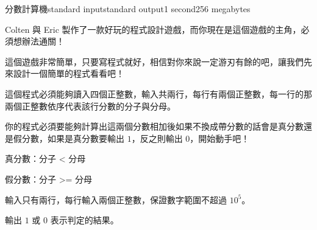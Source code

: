 \begin{problem}{分數計算機}{standard input}{standard output}{1 second}{256 megabytes}

Colten 與 Eric 製作了一款好玩的程式設計遊戲，而你現在是這個遊戲的主角，必須想辦法通關！

這個遊戲非常簡單，只要寫程式就好，相信對你來說一定游刃有餘的吧，讓我們先來設計一個簡單的程式看看吧！

這個程式必須能夠讀入四個正整數，輸入共兩行，每行有兩個正整數，每一行的那兩個正整數依序代表該行分數的分子與分母。

你的程式必須要能夠計算出這兩個分數相加後如果不換成帶分數的話會是真分數還是假分數，如果是真分數要輸出 $1$，反之則輸出 $0$，開始動手吧！

真分數：分子 < 分母

假分數：分子 >= 分母



\InputFile
輸入只有兩行，每行輸入兩個正整數，保證數字範圍不超過 $10^5$。

\OutputFile
輸出 $1$ 或 $0$ 表示判定的結果。

\Examples

\begin{example}
%
%
\end{example}

\end{problem}

